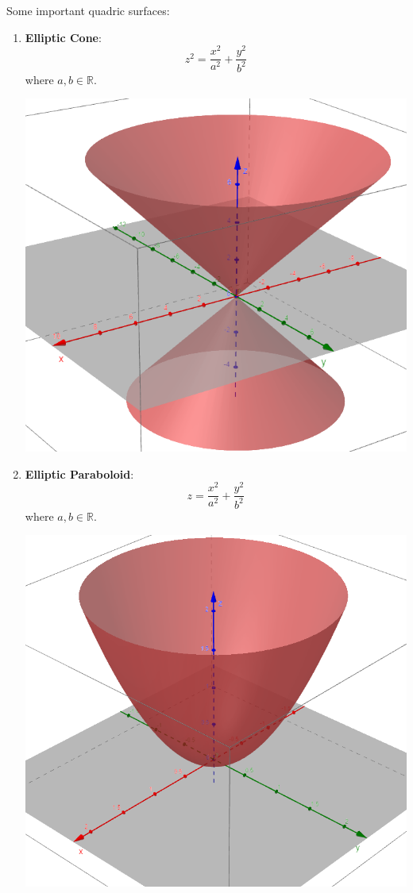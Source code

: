 \documentclass[12pt]{article}
\begin{document}
Some important quadric surfaces:
\begin{enumerate}
\item \textbf{Elliptic Cone}: $$z^2=\frac{x^2}{a^2}+\frac{y^2}{b^2}$$ where $a,b\in \mathbb{R}$.

\includegraphics[scale=0.70]{cone.png}

\item \textbf{Elliptic Paraboloid}: $$z=\frac{x^2}{a^2}+\frac{y^2}{b^2}$$ where $a,b\in \mathbb{R}$.

\includegraphics[scale=0.65]{paraboloid.png}


\end{enumerate}
\end{document}
